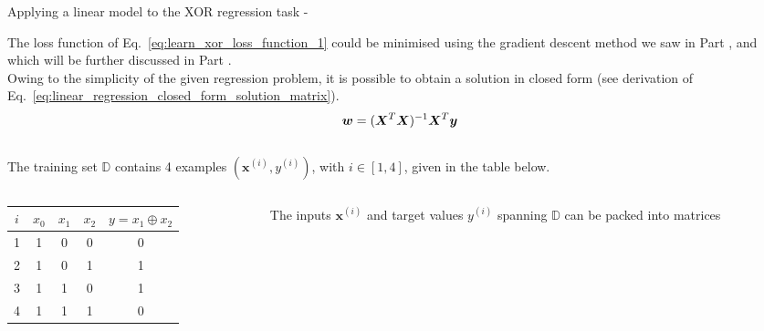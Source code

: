 \begin{frame}[t,allowframebreaks]{Applying a linear model to the XOR regression task -}
    \framebreak


    The \gls{loss function} 
    of Eq.~\ref{eq:learn_xor_loss_function_1} 
    could be minimised using the 
    \gls{gradient descent} 
    method we saw in Part \prevpart, 
    and which will be further discussed in Part \nextpart.\\
    \vspace{0.1cm}
    Owing to the simplicity of the given 
    \gls{regression} problem, 
    it is possible to obtain a solution in closed form 
    (see derivation of Eq.~\ref{eq:linear_regression_closed_form_solution_matrix}).\\
    \vspace{-0.2cm}
    \begin{equation*}
        \boldsymbol{w} = (\boldsymbol{X}^T \boldsymbol{X})^{-1} \boldsymbol{X}^T \boldsymbol{y}
    \end{equation*}\\
    \vspace{0.1cm}
    The training set $\mathbb{D}$ contains 4 examples 
    $(\mathbf{x}^{(i)},y^{(i)})$, with $i \in [1,4]$, given in the table below.\\
    \vspace{0.1cm}
    \begin{columns}[t]
        \begin{column}{0.44\textwidth}
            \vspace{-0.6cm}
            \begin{center}
                \begin{tabular}{ c | c c c | c }
                 $i$ & $x_0$ & $x_1$ & $x_2$ & $y = x_1 \oplus x_2$ \\ 
                 \hline
                 1 & 1 & 0 & 0 & 0 \\  
                 2 & 1 & 0 & 1 & 1 \\   
                 3 & 1 & 1 & 0 & 1 \\  
                 4 & 1 & 1 & 1 & 0 \\   
                \end{tabular}
            \end{center}
        \end{column}
        \begin{column}{0.56\textwidth}
            The inputs $\mathbf{x}^{(i)}$ and target values
            $y^{(i)}$ spanning $\mathbb{D}$ can be packed into matrices

\end{column}
\end{columns}
\end{frame}
